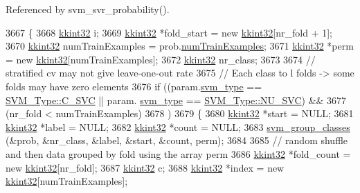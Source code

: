 Referenced by svm\+\_\+svr\+\_\+probability().


\begin{DoxyCode}
3667 \{
3668   \hyperlink{namespace_k_k_b_a8fa4952cc84fda1de4bec1fbdd8d5b1b}{kkint32} i;
3669   \hyperlink{namespace_k_k_b_a8fa4952cc84fda1de4bec1fbdd8d5b1b}{kkint32} *fold\_start = \textcolor{keyword}{new} \hyperlink{namespace_k_k_b_a8fa4952cc84fda1de4bec1fbdd8d5b1b}{kkint32}[nr\_fold + 1];
3670   \hyperlink{namespace_k_k_b_a8fa4952cc84fda1de4bec1fbdd8d5b1b}{kkint32} numTrainExamples = prob.\hyperlink{struct_s_v_m289___m_f_s_1_1svm__problem_a16d137e053c79776e064691a20fa80ee}{numTrainExamples};
3671   \hyperlink{namespace_k_k_b_a8fa4952cc84fda1de4bec1fbdd8d5b1b}{kkint32} *perm = \textcolor{keyword}{new} \hyperlink{namespace_k_k_b_a8fa4952cc84fda1de4bec1fbdd8d5b1b}{kkint32}[numTrainExamples];
3672   \hyperlink{namespace_k_k_b_a8fa4952cc84fda1de4bec1fbdd8d5b1b}{kkint32} nr\_class;
3673 
3674   \textcolor{comment}{// stratified cv may not give leave-one-out rate}
3675   \textcolor{comment}{// Each class to l folds -> some folds may have zero elements}
3676   \textcolor{keywordflow}{if}  ((param.\hyperlink{struct_s_v_m289___m_f_s_1_1svm__parameter_a803dee598ce609cc4ccb4fdbfa99cd1b}{svm\_type} == \hyperlink{namespace_s_v_m233_acde4c278f323c82a6b41c27f6f30738aa942f03bda3ae7dbb9e945f161c95ab97}{SVM\_Type::C\_SVC} || param.
      \hyperlink{struct_s_v_m289___m_f_s_1_1svm__parameter_a803dee598ce609cc4ccb4fdbfa99cd1b}{svm\_type} == \hyperlink{namespace_s_v_m233_acde4c278f323c82a6b41c27f6f30738aa7705bf71b9d3c7169b4d201acb2b30b8}{SVM\_Type::NU\_SVC})  && 
3677        (nr\_fold < numTrainExamples)
3678       )
3679   \{
3680     \hyperlink{namespace_k_k_b_a8fa4952cc84fda1de4bec1fbdd8d5b1b}{kkint32} *start = NULL;
3681     \hyperlink{namespace_k_k_b_a8fa4952cc84fda1de4bec1fbdd8d5b1b}{kkint32} *label = NULL;
3682     \hyperlink{namespace_k_k_b_a8fa4952cc84fda1de4bec1fbdd8d5b1b}{kkint32} *count = NULL;
3683     \hyperlink{svm2_8cpp_a50e8a1e35b79b63599a92a959314de95}{svm\_group\_classes} (&prob, &nr\_class, &label, &start, &count, perm);
3684 
3685     \textcolor{comment}{// random shuffle and then data grouped by fold using the array perm}
3686     \hyperlink{namespace_k_k_b_a8fa4952cc84fda1de4bec1fbdd8d5b1b}{kkint32} *fold\_count = \textcolor{keyword}{new} \hyperlink{namespace_k_k_b_a8fa4952cc84fda1de4bec1fbdd8d5b1b}{kkint32}[nr\_fold];
3687     \hyperlink{namespace_k_k_b_a8fa4952cc84fda1de4bec1fbdd8d5b1b}{kkint32} c;
3688     \hyperlink{namespace_k_k_b_a8fa4952cc84fda1de4bec1fbdd8d5b1b}{kkint32} *index = \textcolor{keyword}{new} \hyperlink{namespace_k_k_b_a8fa4952cc84fda1de4bec1fbdd8d5b1b}{kkint32}[numTrainExamples];

\end{DoxyCode}
